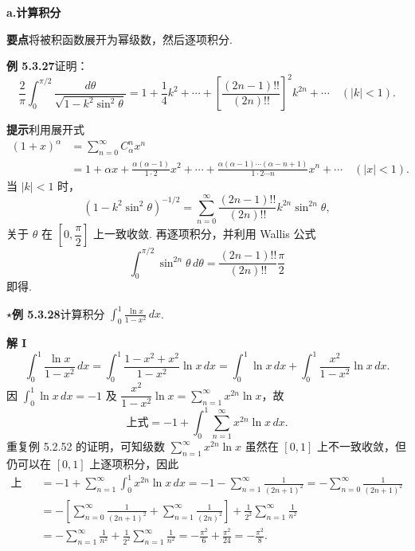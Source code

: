 \documentclass[UTF8,12pt,a4paper,fontset=fandol]{ctexart}
\begin{document}
\noindent\textbf{a.\quad 计算积分}

\noindent\textbf{要点}\quad 将被积函数展开为幂级数，然后逐项积分.

\noindent\textbf{例 5.3.27}\quad 证明：
\[
  \frac2\pi\int_0^{\pi/2}\frac{d\theta}{\sqrt{1-k^2\sin^2\theta}}
  =1+\frac14k^2+\cdots+
  \left[\frac{(2n-1)!!}{(2n)!!}\right]^2k^{2n}+\cdots\quad(|k|<1).
\]

\noindent\textbf{提示}\quad 利用展开式
\[
\begin{aligned}
(1+x)^\alpha
&=\sum_{n=0}^{\infty}C_\alpha^nx^n\\
&=1+\alpha x+\frac{\alpha(\alpha-1)}{1\cdot2}x^2+\cdots
+\frac{\alpha(\alpha-1)\cdots(\alpha-n+1)}{1\cdot2\cdots n}x^n+\cdots\quad(|x|<1).
\end{aligned}
\]
当 $|k|<1$ 时，
\[
  (1-k^2\sin^2\theta)^{-1/2}
  =\sum_{n=0}^{\infty}\frac{(2n-1)!!}{(2n)!!}k^{2n}\sin^{2n}\theta,
\]
关于 $\theta$ 在 $\left[0,\dfrac\pi2\right]$ 上一致收敛. 再逐项积分，并利用 Wallis 公式
\[
  \int_0^{\pi/2}\sin^{2n}\theta\,d\theta
  =\frac{(2n-1)!!}{(2n)!!}\frac\pi2
\]
即得.

\noindent\(\star\)\textbf{例 5.3.28}\quad 计算积分
$\displaystyle\int_0^1\frac{\ln x}{1-x^2}\,dx$.

\noindent\textbf{解 I}\quad
\[
  \int_0^1\frac{\ln x}{1-x^2}\,dx
  =\int_0^1\frac{1-x^2+x^2}{1-x^2}\ln x\,dx
  =\int_0^1\ln x\,dx+\int_0^1\frac{x^2}{1-x^2}\ln x\,dx.
\]
因 $\displaystyle\int_0^1\ln x\,dx=-1$ 及
$\dfrac{x^2}{1-x^2}\ln x=\displaystyle\sum_{n=1}^{\infty}x^{2n}\ln x$，故
\[
  \text{上式}=-1+\int_0^1\sum_{n=1}^{\infty}x^{2n}\ln x\,dx.
\]
重复例 5.2.52 的证明，可知级数 $\displaystyle\sum_{n=1}^{\infty}x^{2n}\ln x$ 虽然在 $[0,1]$ 上不一致收敛，但仍可以在 $[0,1]$ 上逐项积分，因此
\[
\begin{aligned}
\text{上式}
&=-1+\sum_{n=1}^{\infty}\int_0^1x^{2n}\ln x\,dx
=-1-\sum_{n=1}^{\infty}\frac1{(2n+1)^2}
=-\sum_{n=0}^{\infty}\frac1{(2n+1)^2}\\
&=-\left[\sum_{n=0}^{\infty}\frac1{(2n+1)^2}
+\sum_{n=1}^{\infty}\frac1{(2n)^2}\right]
+\frac1{2^2}\sum_{n=1}^{\infty}\frac1{n^2}\\
&=-\sum_{n=1}^{\infty}\frac1{n^2}
+\frac1{2^2}\sum_{n=1}^{\infty}\frac1{n^2}
=-\frac{\pi^2}{6}+\frac{\pi^2}{24}
=-\frac{\pi^2}{8}.
\end{aligned}
\]
\end{document}
